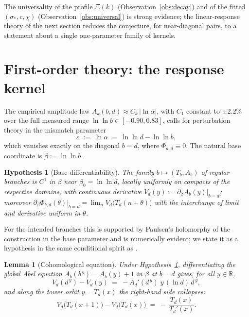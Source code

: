 \documentclass[11pt,a4paper]{article}
\newtheorem{lemma}[theorem]{Lemma}
\newtheorem{hypothesis}[theorem]{Hypothesis}
\theoremstyle{definition}
\theoremstyle{remark}
\newcommand{\R}{\mathbb{R}}
\begin{document}
The universality of the profile $\Xi(k)$ (Observation~\ref{obs:decay}) and of the fitted
$(\sigma_*,c,\chi)$ (Observation~\ref{obs:universal}) is strong evidence; the linear-response
theory of the next section reduces the conjecture, for near-diagonal pairs, to a statement
about a single one-parameter family of kernels.

\section{First-order theory: the response kernel}\label{sec:kernel}

The empirical amplitude law $A_k(b,d)\approx C_k\,\lvert\ln\alpha\rvert$, with $C_1$ constant
to $\pm2.2\%$ over the full measured range $\ln\ln b\in[-0.90,0.83]$, calls for perturbation
theory in the mismatch parameter
\[
\varepsilon\;:=\;\ln\alpha\;=\;\ln\ln d-\ln\ln b,
\]
which vanishes exactly on the diagonal $b=d$, where $\Phi_{d,d}\equiv0$. The natural base
coordinate is $\beta:=\ln\ln b$.

\begin{hypothesis}[Base differentiability]\label{hyp:basediff}
The family $b\mapsto(T_b,A_b)$ of regular branches is $C^1$ in $\beta$ near $\beta_0=\ln\ln
d$, locally uniformly on compacts of the respective domains, with continuous derivative
$V_d(y):=\partial_\beta A_b(y)\big|_{b=d}$; moreover
$\partial_\beta\Phi_{b,d}(\theta)\big|_{b=d}=\lim_n V_d\bigl(T_d(n+\theta)\bigr)$ with the
interchange of limit and derivative uniform in $\theta$.
\end{hypothesis}

For the intended branches this is supported by Paulsen's holomorphy of the construction in
the base parameter \cite{paulsen} and is numerically evident; we state it as a hypothesis in
the same conditional spirit as \cite[Rem.~7.4]{unified}.

\begin{lemma}[Cohomological equation]\label{lem:cohom}
Under Hypothesis~\ref{hyp:basediff}, differentiating the global Abel equation
$A_b(b^{\,y})=A_b(y)+1$ in $\beta$ at $b=d$ gives, for all $y\in\R$,
\begin{equation}\label{eq:cohom}
V_d(d^{\,y})-V_d(y)\;=\;-A_d'(d^{\,y})\;y\,(\ln d)\,d^{\,y},
\end{equation}
and along the tower orbit $y=T_d(x)$ the right-hand side collapses:
\begin{equation}\label{eq:orbit}
V_d\bigl(T_d(x+1)\bigr)-V_d\bigl(T_d(x)\bigr)\;=\;-\,\frac{T_d(x)}{T_d'(x)} .
\end{equation}
\end{lemma}
\end{document}
